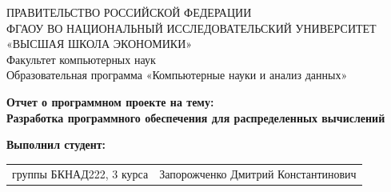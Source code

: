 \begin{titlepage}
\newpage

{
\begin{center}
ПРАВИТЕЛЬСТВО РОССИЙСКОЙ ФЕДЕРАЦИИ\\
ФГАОУ ВО НАЦИОНАЛЬНЫЙ ИССЛЕДОВАТЕЛЬСКИЙ УНИВЕРСИТЕТ\\
«ВЫСШАЯ ШКОЛА ЭКОНОМИКИ»
\\
\bigskip
Факультет компьютерных наук\\
Образовательная программа «Компьютерные науки и анализ данных»
\end{center}
}

\vspace{2em}
\vspace{4em}

\begin{center}
{\bf Отчет о программном проекте на тему:}\\
{\bf Разработка программного обеспечения для распределенных вычислений}\\
\end{center}

\vspace{2em}

{\bf Выполнил студент: \vspace{2mm}}

{
\begin{tabular}{l@{\hskip 1.5cm}l}
группы БКНАД222, 3 курса & Запорожченко Дмитрий Константинович \\
\end{tabular}}



\end{titlepage}
